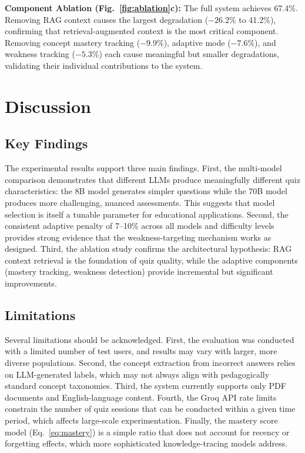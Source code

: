 \documentclass[runningheads]{llncs}
\begin{document}
\textbf{Component Ablation (Fig.~\ref{fig:ablation}c):} The full system achieves 67.4\%. Removing RAG context causes the largest degradation ($-26.2\%$ to 41.2\%), confirming that retrieval-augmented context is the most critical component. Removing concept mastery tracking ($-9.9\%$), adaptive mode ($-7.6\%$), and weakness tracking ($-5.3\%$) each cause meaningful but smaller degradations, validating their individual contributions to the system.

\section{Discussion}

\subsection{Key Findings}

The experimental results support three main findings. First, the multi-model comparison demonstrates that different LLMs produce meaningfully different quiz characteristics: the 8B model generates simpler questions while the 70B model produces more challenging, nuanced assessments. This suggests that model selection is itself a tunable parameter for educational applications. Second, the consistent adaptive penalty of 7--10\% across all models and difficulty levels provides strong evidence that the weakness-targeting mechanism works as designed. Third, the ablation study confirms the architectural hypothesis: RAG context retrieval is the foundation of quiz quality, while the adaptive components (mastery tracking, weakness detection) provide incremental but significant improvements.

\subsection{Limitations}

Several limitations should be acknowledged. First, the evaluation was conducted with a limited number of test users, and results may vary with larger, more diverse populations. Second, the concept extraction from incorrect answers relies on LLM-generated labels, which may not always align with pedagogically standard concept taxonomies. Third, the system currently supports only PDF documents and English-language content. Fourth, the Groq API rate limits constrain the number of quiz sessions that can be conducted within a given time period, which affects large-scale experimentation. Finally, the mastery score model (Eq.~\ref{eq:mastery}) is a simple ratio that does not account for recency or forgetting effects, which more sophisticated knowledge-tracing models address.
\end{document}
